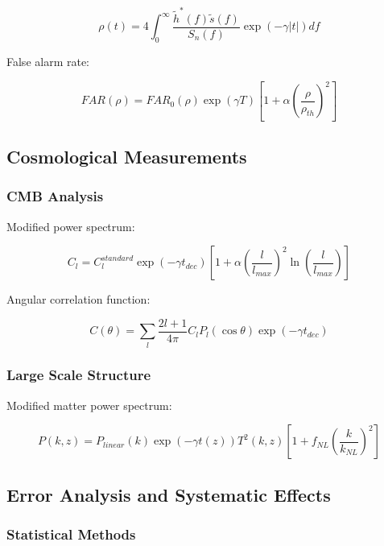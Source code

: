 \documentclass[12pt]{article}
\theoremstyle{plain}
\theoremstyle{definition}
\theoremstyle{remark}
\begin{document}
\begin{equation}
\rho(t) = 4\int_0^\infty \frac{\tilde{h}^*(f)\tilde{s}(f)}{S_n(f)}\exp(-\gamma|t|)df
\end{equation}

False alarm rate:

\begin{equation}
FAR(\rho) = FAR_0(\rho)\exp(\gamma T)\left[1 + \alpha\left(\frac{\rho}{\rho_{th}}\right)^2\right]
\end{equation}

\subsection{Cosmological Measurements}

\subsubsection{CMB Analysis}

Modified power spectrum:

\begin{equation}
C_l = C_l^{standard}\exp(-\gamma t_{dec})\left[1 + \alpha\left(\frac{l}{l_{max}}\right)^2\ln\left(\frac{l}{l_{max}}\right)\right]
\end{equation}

Angular correlation function:

\begin{equation}
C(\theta) = \sum_l \frac{2l+1}{4\pi}C_l P_l(\cos\theta)\exp(-\gamma t_{dec})
\end{equation}

\subsubsection{Large Scale Structure}

Modified matter power spectrum:

\begin{equation}
P(k,z) = P_{linear}(k)\exp(-\gamma t(z))T^2(k,z)\left[1 + f_{NL}\left(\frac{k}{k_{NL}}\right)^2\right]
\end{equation}

\subsection{Error Analysis and Systematic Effects}

\subsubsection{Statistical Methods}
\end{document}
